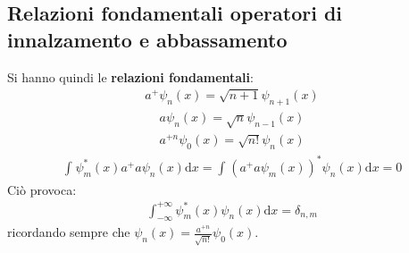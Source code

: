 \subsection{Relazioni fondamentali operatori di innalzamento e abbassamento} %
Si hanno quindi le \textbf{relazioni fondamentali}:
\begin{equation}\begin{split}
a^+\psi _n\left(x\right)=\sqrt{n+1}\psi _{n+1}\left(x\right)
\end{split}\end{equation}
\begin{equation}\begin{split}
a\psi _n\left(x\right)=\sqrt{n}\psi _{n-1}\left(x\right)
\end{split}\end{equation}
\begin{equation}\begin{split}
a^{+n}\psi _0\left(x\right)=\sqrt{n!}\psi _n\left(x\right)
\end{split}\end{equation}
\begin{equation}\begin{split}
\int_{}^{}{\psi ^*_m\left(x\right)a^+a\psi _n\left(x\right) \textrm{d}x}=\int_{}^{}{\left(a^+a\psi _m\left(x\right)\right)^*\psi _n\left(x\right) \textrm{d}x}=0
\end{split}\end{equation}
Ciò provoca:
\begin{equation}\begin{split}
\int_{-\infty }^{+\infty }{\psi ^*_m\left(x\right)\psi _n\left(x\right) \textrm{d}x}=\delta _{n,m}
\end{split}\end{equation}
ricordando sempre che $\psi _n\left(x\right)=\frac{a^{+n}}{\sqrt{n!}}\psi _0\left(x\right)$.